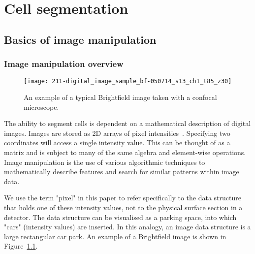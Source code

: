 
\chapter{Cell segmentation}

\ifpdf
    \graphicspath{{Chapter2/Figs/Raster/}{Chapter2/Figs/PDF/}{Chapter2/Figs/}}
\else
    \graphicspath{{Chapter2/Figs/Vector/}{Chapter2/Figs/}}
\fi

\section{Basics of image manipulation}

\subsection{Image manipulation overview}

\begin{figure}[htbp!]
\centering
\texttt{[image: 211-digital\_image\_sample\_bf-050714\_s13\_ch1\_t85\_z30]}
\caption[Brightfield image sample]{An example of a typical Brightfield image taken with a confocal microscope.}
\label{fig:digital_image_sample_bf}
\end{figure}

The ability to segment cells is dependent on a mathematical description of digital images. Images are stored as 2D arrays of pixel intensities~\cite{glassner}. Specifying two coordinates will access a single intensity value. This can be thought of as a matrix and is subject to many of the same algebra and element-wise operations. Image manipulation is the use of various algorithmic techniques to mathematically describe features and search for similar patterns within image data.

We use the term "pixel" in this paper to refer specifically to the data structure that holds one of these intensity values, not to the physical surface section in a detector. The data structure can be visualised as a parking space, into which "cars" (intensity values) are inserted. In this analogy, an image data structure is a large rectangular car park. An example of a Brightfield image is shown in Figure~\ref{fig:digital_image_sample_bf}.

